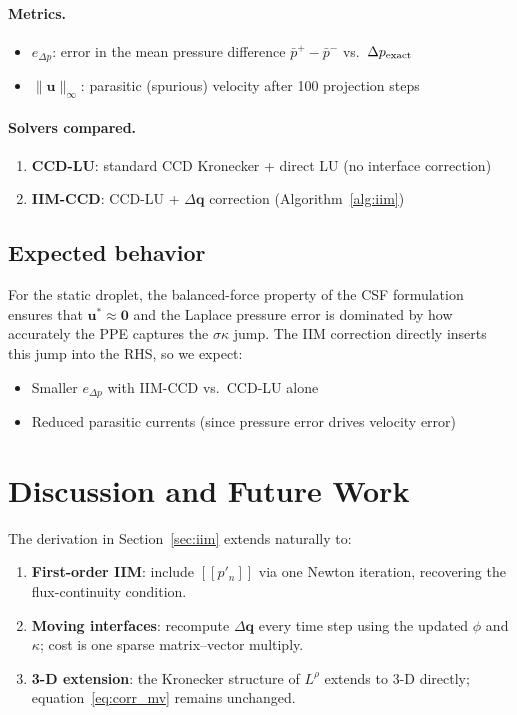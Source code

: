 \documentclass[11pt, a4paper]{article}
\newcommand{\jump}[1]{[\![#1]\!]}
\begin{document}
\paragraph{Metrics.}
\begin{itemize}
  \item $e_{\Delta p}$: error in the mean pressure difference
        $\bar{p}^+ - \bar{p}^-$ vs.\ $\Delta p_{\rm exact}$
  \item $\|\mathbf{u}\|_\infty$: parasitic (spurious) velocity after
        100 projection steps
\end{itemize}

\paragraph{Solvers compared.}
\begin{enumerate}
  \item \textbf{CCD-LU}: standard CCD Kronecker + direct LU (no interface correction)
  \item \textbf{IIM-CCD}: CCD-LU + $\Delta\mathbf{q}$ correction (Algorithm~\ref{alg:iim})
\end{enumerate}

\subsection{Expected behavior}
For the static droplet, the balanced-force property of the CSF formulation
ensures that $\mathbf{u}^* \approx \mathbf{0}$ and the Laplace pressure error
is dominated by how accurately the PPE captures the $\sigma\kappa$ jump.
The IIM correction directly inserts this jump into the RHS, so we expect:
\begin{itemize}
  \item Smaller $e_{\Delta p}$ with IIM-CCD vs.\ CCD-LU alone
  \item Reduced parasitic currents (since pressure error drives velocity error)
\end{itemize}

\section{Discussion and Future Work}
\label{sec:discussion}

The derivation in Section~\ref{sec:iim} extends naturally to:
\begin{enumerate}
  \item \textbf{First-order IIM}: include $\jump{p'_n}$ via one Newton
        iteration, recovering the flux-continuity condition.
  \item \textbf{Moving interfaces}: recompute $\Delta\mathbf{q}$ every time
        step using the updated $\phi$ and $\kappa$; cost is one sparse
        matrix--vector multiply.
  \item \textbf{3-D extension}: the Kronecker structure of $L^\rho$ extends
        to 3-D directly; equation~\eqref{eq:corr_mv} remains unchanged.
\end{enumerate}
\end{document}
